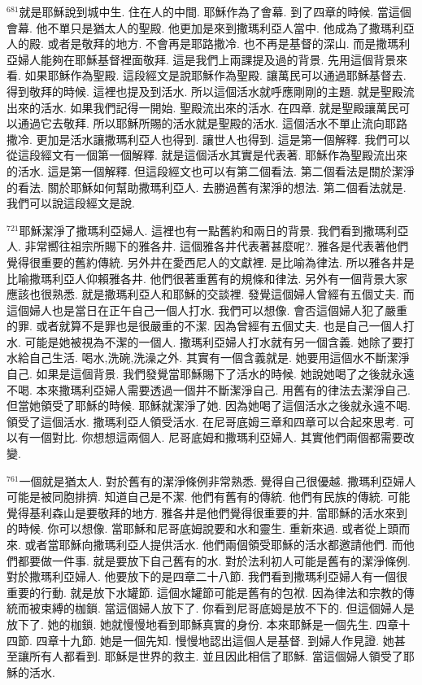 \documentclass{book}
\begin{document}
$^{681}$就是耶穌說到城中生.
住在人的中間.
耶穌作為了會幕.
到了四章的時候.
當這個會幕.
他不單只是猶太人的聖殿.
他更加是來到撒瑪利亞人當中.
他成為了撒瑪利亞人的殿.
或者是敬拜的地方.
不會再是耶路撒冷.
也不再是基督的深山.
而是撒瑪利亞婦人能夠在耶穌基督裡面敬拜.
這是我們上兩課提及過的背景.
先用這個背景來看.
如果耶穌作為聖殿.
這段經文是說耶穌作為聖殿.
讓萬民可以通過耶穌基督去.
得到敬拜的時候.
這裡也提及到活水.
所以這個活水就呼應剛剛的主題.
就是聖殿流出來的活水.
如果我們記得一開始.
聖殿流出來的活水.
在四章.
就是聖殿讓萬民可以通過它去敬拜.
所以耶穌所賜的活水就是聖殿的活水.
這個活水不單止流向耶路撒冷.
更加是活水讓撒瑪利亞人也得到.
讓世人也得到.
這是第一個解釋.
我們可以從這段經文有一個第一個解釋.
就是這個活水其實是代表著.
耶穌作為聖殿流出來的活水.
這是第一個解釋.
但這段經文也可以有第二個看法.
第二個看法是關於潔淨的看法.
關於耶穌如何幫助撒瑪利亞人.
去勝過舊有潔淨的想法.
第二個看法就是.
我們可以說這段經文是說.

$^{721}$耶穌潔淨了撒瑪利亞婦人.
這裡也有一點舊約和兩日的背景.
我們看到撒瑪利亞人.
非常嚮往祖宗所賜下的雅各井.
這個雅各井代表著甚麼呢?.
雅各是代表著他們覺得很重要的舊約傳統.
另外井在愛西尼人的文獻裡.
是比喻為律法.
所以雅各井是比喻撒瑪利亞人仰賴雅各井.
他們很著重舊有的規條和律法.
另外有一個背景大家應該也很熟悉.
就是撒瑪利亞人和耶穌的交談裡.
發覺這個婦人曾經有五個丈夫.
而這個婦人也是當日在正午自己一個人打水.
我們可以想像.
會否這個婦人犯了嚴重的罪.
或者就算不是罪也是很嚴重的不潔.
因為曾經有五個丈夫.
也是自己一個人打水.
可能是她被視為不潔的一個人.
撒瑪利亞婦人打水就有另一個含義.
她除了要打水給自己生活.
喝水,洗碗,洗澡之外.
其實有一個含義就是.
她要用這個水不斷潔淨自己.
如果是這個背景.
我們發覺當耶穌賜下了活水的時候.
她說她喝了之後就永遠不喝.
本來撒瑪利亞婦人需要透過一個井不斷潔淨自己.
用舊有的律法去潔淨自己.
但當她領受了耶穌的時候.
耶穌就潔淨了她.
因為她喝了這個活水之後就永遠不喝.
領受了這個活水.
撒瑪利亞人領受活水.
在尼哥底姆三章和四章可以合起來思考.
可以有一個對比.
你想想這兩個人.
尼哥底姆和撒瑪利亞婦人.
其實他們兩個都需要改變.

$^{761}$一個就是猶太人.
對於舊有的潔淨條例非常熟悉.
覺得自己很優越.
撒瑪利亞婦人可能是被同胞排擠.
知道自己是不潔.
他們有舊有的傳統.
他們有民族的傳統.
可能覺得基利森山是要敬拜的地方.
雅各井是他們覺得很重要的井.
當耶穌的活水來到的時候.
你可以想像.
當耶穌和尼哥底姆說要和水和靈生.
重新來過.
或者從上頭而來.
或者當耶穌向撒瑪利亞人提供活水.
他們兩個領受耶穌的活水都邀請他們.
而他們都要做一件事.
就是要放下自己舊有的水.
對於法利初人可能是舊有的潔淨條例.
對於撒瑪利亞婦人.
他要放下的是四章二十八節.
我們看到撒瑪利亞婦人有一個很重要的行動.
就是放下水罐節.
這個水罐節可能是舊有的包袱.
因為律法和宗教的傳統而被束縛的枷鎖.
當這個婦人放下了.
你看到尼哥底姆是放不下的.
但這個婦人是放下了.
她的枷鎖.
她就慢慢地看到耶穌真實的身份.
本來耶穌是一個先生.
四章十四節.
四章十九節.
她是一個先知.
慢慢地認出這個人是基督.
到婦人作見證.
她甚至讓所有人都看到.
耶穌是世界的救主.
並且因此相信了耶穌.
當這個婦人領受了耶穌的活水.
\end{document}
